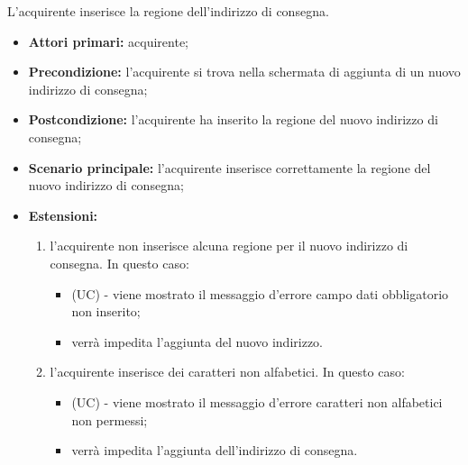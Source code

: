 L'acquirente inserisce la regione dell'indirizzo di consegna.
\begin{itemize}
    \item \textbf{Attori primari:} acquirente;
    \item \textbf{Precondizione:} l'acquirente si trova nella schermata di aggiunta di un nuovo indirizzo di consegna;
    \item \textbf{Postcondizione:} l'acquirente ha inserito la regione del nuovo indirizzo di consegna;
    \item \textbf{Scenario principale:} l'acquirente inserisce correttamente la regione del nuovo indirizzo di consegna;
    \item \textbf{Estensioni:}
    \begin{enumerate}[label=\lett]
        \item l'acquirente non inserisce alcuna regione per il nuovo indirizzo di consegna. In questo caso:
        \begin{itemize}
            \item (UC) - viene mostrato il messaggio d'errore campo dati obbligatorio non inserito;
            \item verrà impedita l'aggiunta del nuovo indirizzo.
        \end{itemize}
        \item l'acquirente inserisce dei caratteri non alfabetici. In questo caso:
        \begin{itemize}
            \item (UC) - viene mostrato il messaggio d'errore caratteri non alfabetici non permessi;
            \item verrà impedita l'aggiunta dell'indirizzo di consegna.
        \end{itemize}
    \end{enumerate}
\end{itemize}

